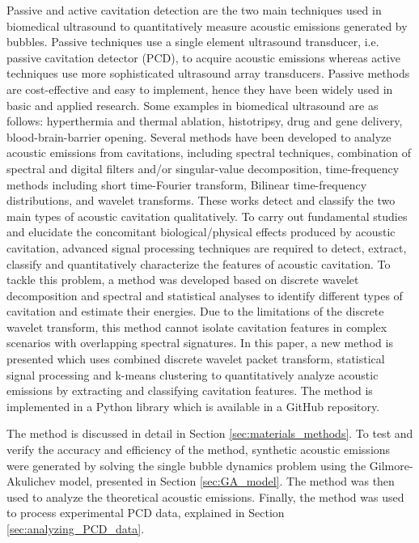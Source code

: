 \documentclass[preprint, linenumbers]{revtex4-2}
\newcommand{\km}{k-means }
\begin{document}
Passive\cite{coussios2008,gyongy2010} and active \cite{roy1990,cleveland2000} cavitation detection are the two main techniques used in biomedical ultrasound to quantitatively measure acoustic emissions generated by bubbles. Passive techniques use a single element ultrasound transducer, i.e. passive cavitation detector (PCD), to acquire acoustic emissions whereas active techniques use more sophisticated ultrasound array transducers. Passive methods are cost-effective and easy to implement, hence they have been widely used in basic and applied research. Some examples in biomedical ultrasound are as follows: hyperthermia and thermal ablation,\cite{kok2020} histotripsy,\cite{deandrade2021} drug and gene delivery,\cite{izadifar2019} blood-brain-barrier opening.\cite{timbie2015,mcdannold2006} Several methods have been developed to analyze acoustic emissions from cavitations, including spectral techniques, combination of spectral and digital filters and/or singular-value decomposition, time-frequency methods including short time-Fourier transform, Bilinear time-frequency distributions, and wavelet transforms.\cite{liang2006,frohly2000,coussios2008,farny2009,moholkar2002,chitnis2019} These works detect and classify the two main types of acoustic cavitation qualitatively. To carry out fundamental studies and elucidate the concomitant biological/physical effects produced by acoustic cavitation, advanced signal processing techniques are required to detect, extract, classify and quantitatively characterize the features of acoustic cavitation. To tackle this problem, a method was developed based on discrete wavelet decomposition and spectral and statistical analyses to identify different types of cavitation and estimate their energies.\cite{haqshenas2015} Due to the limitations of the discrete wavelet transform, this method cannot isolate cavitation features in complex scenarios with overlapping spectral signatures. In this paper, a new method is presented which uses combined discrete wavelet packet transform, statistical signal processing and \km clustering to quantitatively analyze acoustic emissions by extracting and classifying cavitation features. The method is implemented in a Python library which is available in a GitHub repository. \cite{wpt-cavitation2024}

The method is discussed in detail in Section \ref{sec:materials_methods}. To test and verify the accuracy and efficiency of the method, synthetic acoustic emissions were generated by solving the single bubble dynamics problem using the Gilmore-Akulichev model, presented in Section \ref{sec:GA_model}. The method was then used to analyze the theoretical acoustic emissions. Finally, the method was used to process experimental PCD data, explained in Section \ref{sec:analyzing_PCD_data}.
\end{document}
